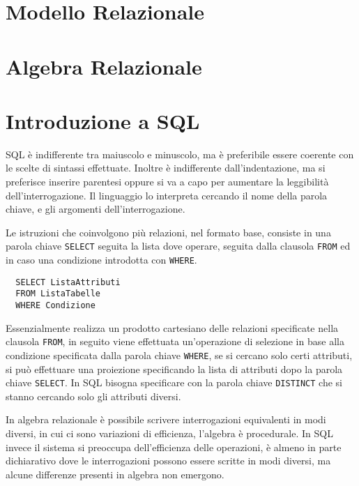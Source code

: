 \documentclass{article}
\numberwithin{equation}{subsection}
\begin{document}
\clearpage

\section{Modello Relazionale}







\clearpage

\section{Algebra Relazionale}

\clearpage

\section{Introduzione a SQL}


SQL è indifferente tra maiuscolo e minuscolo, ma è preferibile essere coerente con le scelte di sintassi effettuate. Inoltre è indifferente 
dall'indentazione, ma si preferisce inserire parentesi oppure si va a capo per aumentare la leggibilità dell'interrogazione. Il linguaggio lo 
interpreta cercando il nome della parola chiave, e gli argomenti dell'interrogazione.  

Le istruzioni che coinvolgono più relazioni, nel formato base, consiste in una parola chiave \verb|SELECT| seguita la lista dove operare, 
seguita dalla clausola \verb|FROM| ed in caso una condizione introdotta con \verb|WHERE|. 

\begin{verbatim}
  SELECT ListaAttributi
  FROM ListaTabelle
  WHERE Condizione
\end{verbatim}

Essenzialmente realizza un prodotto cartesiano delle relazioni specificate nella clausola \verb|FROM|, in seguito viene effettuata un'operazione di selezione in base alla 
condizione specificata dalla parola chiave \verb|WHERE|, se si cercano solo certi attributi, si può effettuare una proiezione specificando la lista di attributi dopo 
la parola chiave \verb|SELECT|. In SQL bisogna specificare con la parola chiave \verb|DISTINCT| che si stanno cercando solo gli attributi diversi. 


In algebra relazionale è possibile scrivere interrogazioni equivalenti in modi diversi, in cui ci sono variazioni di efficienza, 
l'algebra è procedurale. In SQL invece il sistema si preoccupa dell'efficienza delle operazioni, è almeno in parte dichiarativo dove le interrogazioni 
possono essere scritte in modi diversi, ma alcune differenze presenti in algebra non emergono. 
\end{document}
